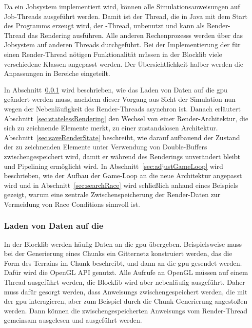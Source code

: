 Da ein Jobsystem implementiert wird, können alle Simulationsanweisungen auf Job-Threads ausgeführt werden. Damit ist der Thread, die in Java mit dem Start des Programms erzeugt wird, der -Thread, unbenutzt und kann als Render-Thread das Rendering ausführen. Alle anderen \glspl{Rechenprozess} werden über das Jobsystem auf anderen Threads durchgeführt. Bei der Implementierung der für einen Render-Thread nötigen Funktionalität müssen in der Blocklib viele verschiedene Klassen angepasst werden. Der Übersichtlichkeit halber werden die Anpassungen in Bereiche eingeteilt. 

In Abschnitt~\ref{sec:loader} wird beschrieben, wie das Laden von Daten auf die \ac{gpu} geändert werden muss, nachdem dieser Vorgang aus Sicht der Simulation nun wegen der Nebenläufigkeit des Render-Threads asynchron ist. Danach erläutert Abschnitt~\ref{sec:statelessRendering} den Wechsel von einer Render-Architektur, die sich zu zeichnende Elemente merkt, zu einer zustandslosen Architektur. Abschnitt~\ref{sec:saveRenderState} beschreibt, wie darauf aufbauend der Zustand der zu zeichnenden Elemente unter Verwendung von Double-Buffers zwischengespeichert wird, damit er während des Renderings unverändert bleibt und Pipelining ermöglicht wird. In Abschnitt~\ref{sec:adjustGameLoop} wird beschrieben, wie der Aufbau der Game-Loop an die neue Architektur angepasst wird und in Abschnitt~\ref{sec:searchRace} wird schließlich anhand eines Beispiels gezeigt, warum eine zentrale Zwischenspeicherung der Render-Daten zur Vermeidung von Race Conditions sinnvoll ist.

\subsubsection{Laden von Daten auf die }\label{sec:loader}
In der Blocklib werden häufig Daten an die \ac{gpu} übergeben. Beispielsweise muss bei der Generierung eines Chunks ein Gitternetz konstruiert werden, das die Form des Terrains im Chunk beschreibt, und dann an die \ac{gpu} gesendet werden. Dafür wird die OpenGL API genutzt. Alle Aufrufe an OpenGL müssen auf einem Thread ausgeführt werden, die Blocklib wird aber nebenläufig ausgeführt. Daher muss dafür gesorgt werden, dass \glspl{Anweisung} zwischengespeichert werden, die mit der \ac{gpu} interagieren, aber zum Beispiel durch die Chunk-Generierung angestoßen werden. Dann können die zwischengespeicherten \glspl{Anweisung} vom Render-Thread gemeinsam ausgelesen und ausgeführt werden. 

